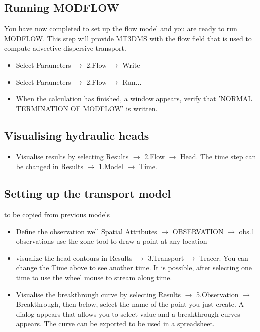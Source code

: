 \subsection{Running MODFLOW}

You have now completed to set up the flow model and you are ready to run MODFLOW.
This step will provide MT3DMS with the flow field that is used to compute 
advective-dispersive transport.

\begin{itemize}

\item Select Parameters $\rightarrow$ 2.Flow $\rightarrow$ Write

\item Select Parameters $\rightarrow$ 2.Flow $\rightarrow$ Run...

\item When the calculation has finished, a window appears, verify that 'NORMAL TERMINATION OF MODFLOW' is written.

\end{itemize}

\subsection{Visualising hydraulic heads}

\begin{itemize}

\item Visualise results by selecting Results $\rightarrow$ 2.Flow $\rightarrow$ Head. The time step can be changed
in Results $\rightarrow$ 1.Model $\rightarrow$ Time.

\end{itemize}

\subsection{Setting up the transport model}

to be copied from previous models

\begin{itemize}

\item Define the observation well Spatial Attributes $\rightarrow$ OBSERVATION $\rightarrow$ obs.1 observations
use the zone tool to draw a point at any location

\item visualize the head contours in Results $\rightarrow$ 3.Transport $\rightarrow$ Tracer. You can change the Time above 
to see another time. It is possible, after selecting one time to use the wheel mouse to stream along time.

\item Visualise the breakthrough curve by selecting Results $\rightarrow$ 5.Observation $\rightarrow$ Breakthrough, then below, 
select the name of the point you just create. A dialog appears that allows you to select value and a breakthrough curves appears.
The curve can be exported to be used in a spreadsheet.

\end{itemize}

